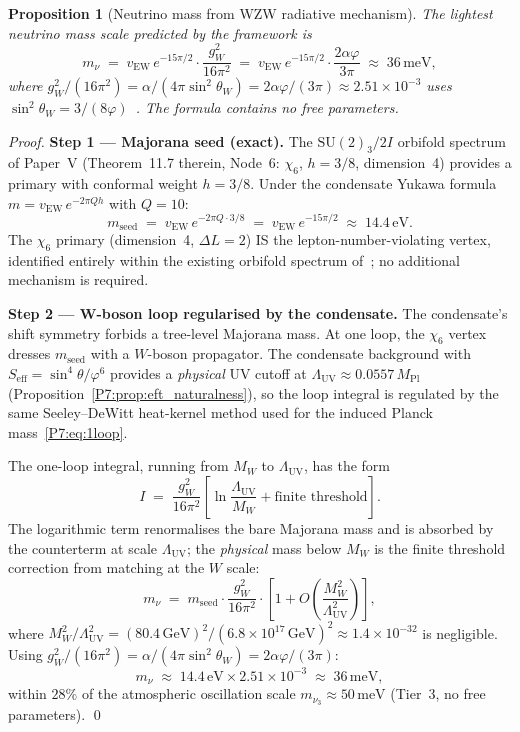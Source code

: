 \documentclass[11pt,a4paper]{article}
\newtheorem{proposition}[theorem]{Proposition}
\theoremstyle{definition}
\theoremstyle{remark}
\newcommand{\vp}{\varphi}
\newcommand{\vEW}{v_{\mathrm{EW}}}
\newcommand{\sinW}{\sin^{2}\!\theta_{W}}
\newcommand{\MPl}{M_{\mathrm{Pl}}}
\newcommand{\LUV}{\Lambda_{\mathrm{UV}}}
\begin{document}
\begin{proposition}[Neutrino mass from WZW radiative mechanism]
\label{P7:prop:neutrino}
The lightest neutrino mass scale predicted by the framework is
\begin{equation}
  m_\nu
  \;=\; \vEW\,e^{-15\pi/2}\cdot\frac{g_W^2}{16\pi^2}
  \;=\; \vEW\,e^{-15\pi/2}\cdot\frac{2\alpha\vp}{3\pi}
  \;\approx\; 36\,\mathrm{meV},
  \label{P7:eq:mnu_prop}
\end{equation}
where $g_W^2/(16\pi^2) = \alpha/(4\pi\sinW) = 2\alpha\vp/(3\pi)
\approx2.51\times10^{-3}$ uses $\sinW = 3/(8\vp)$~\cite{Paper1}.
The formula contains no free parameters.
\end{proposition}

\begin{proof}
\textbf{Step 1 --- Majorana seed (exact).}
The $\mathrm{SU}(2)_3/2I$ orbifold spectrum of Paper~V
(Theorem~11.7 therein, Node~6: $\chi_6$, $h=3/8$, dimension~4)
provides a primary with conformal weight $h=3/8$.
Under the condensate Yukawa formula $m = \vEW\,e^{-2\pi Q h}$ with $Q=10$:
\begin{equation}
  m_{\mathrm{seed}}
  \;=\; \vEW\,e^{-2\pi Q\cdot 3/8}
  \;=\; \vEW\,e^{-15\pi/2}
  \;\approx\; 14.4\,\mathrm{eV}.
  \label{P7:eq:mnu_seed}
\end{equation}
The $\chi_6$ primary (dimension~4, $\Delta L=2$) IS the
lepton-number-violating vertex, identified entirely within the
existing orbifold spectrum of~\cite{Paper5}; no additional mechanism
is required.

\textbf{Step 2 --- W-boson loop regularised by the condensate.}
The condensate's shift symmetry forbids a tree-level Majorana mass.
At one loop, the $\chi_6$ vertex dresses $m_\mathrm{seed}$ with a
$W$-boson propagator.
The condensate background with $S_{\mathrm{eff}}=\sin^4\!\theta/\vp^6$
provides a \emph{physical} UV cutoff at $\LUV\approx0.0557\,\MPl$
(Proposition~\ref{P7:prop:eft_naturalness}), so the loop integral is
regulated by the same Seeley--DeWitt heat-kernel method used for the
induced Planck mass~\eqref{P7:eq:1loop}.

The one-loop integral, running from $M_W$ to $\LUV$, has the form
\[
  I \;=\; \frac{g_W^2}{16\pi^2}
          \!\left[\ln\frac{\LUV}{M_W}
                 + \text{finite threshold}\right].
\]
The logarithmic term renormalises the bare Majorana mass and is
absorbed by the counterterm at scale $\LUV$; the
\emph{physical} mass below $M_W$ is the finite threshold correction
from matching at the $W$ scale:
\begin{equation}
  m_\nu
  \;=\; m_{\mathrm{seed}}\cdot\frac{g_W^2}{16\pi^2}
        \cdot\left[1 + O\!\left(\frac{M_W^2}{\LUV^2}\right)\right],
  \label{P7:eq:mnu_matching}
\end{equation}
where $M_W^2/\LUV^2 = (80.4\,\mathrm{GeV})^2/(6.8\times10^{17}\,\mathrm{GeV})^2
\approx 1.4\times10^{-32}$ is negligible.
Using $g_W^2/(16\pi^2) = \alpha/(4\pi\sinW) = 2\alpha\vp/(3\pi)$:
\[
  m_\nu \;\approx\; 14.4\,\mathrm{eV}\times 2.51\times10^{-3}
        \;\approx\; 36\,\mathrm{meV},
\]
within $28\%$ of the atmospheric oscillation scale
$m_{\nu_3}\approx50\,\mathrm{meV}$ (Tier~3, no free parameters).
\qed
\end{proof}
\end{document}
